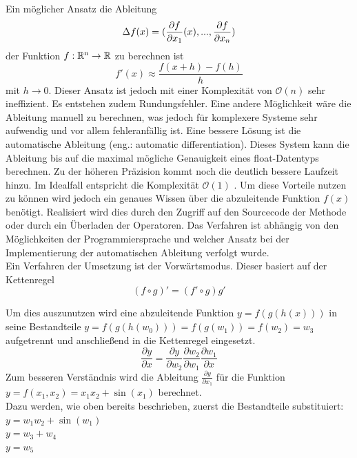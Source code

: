 \documentclass{like}
\begin{document}
Ein möglicher Ansatz die Ableitung 
\begin{equation}
	\Delta{\tiny } f(x) = (\frac{\partial f}{\partial x_1} (x), ..., \frac{\partial f}{\partial x_n})
\end{equation}
der Funktion $f:\mathbb{R} \textsuperscript{n} \rightarrow \mathbb{R} $ zu berechnen ist \\
\begin{equation}
	f'(x) \approx \frac{f(x+h) - f(h)}{h}
\end{equation}
 mit $ h \rightarrow 0$.
Dieser Ansatz ist jedoch mit einer Komplexität von $\mathcal{O}(n)$ sehr ineffizient. Es entstehen zudem Rundungsfehler.
Eine andere Möglichkeit wäre die Ableitung manuell zu berechnen, was jedoch für komplexere Systeme sehr aufwendig und vor allem fehleranfällig ist. Eine bessere Lösung ist die automatische Ableitung (eng.: automatic differentiation). 
Dieses System kann die Ableitung bis auf die maximal mögliche Genau\-ig\-keit eines float-Datentyps berechnen. Zu der höheren Präzision kommt noch die deutlich bessere Laufzeit hinzu. Im Idealfall entspricht die Komplexität $\mathcal{O}(1)$ \cite{julDiff}. Um diese Vorteile nutzen zu können wird jedoch ein genaues Wissen über die abzuleitende Funktion \(f(x)\) benötigt. Realisiert wird dies durch den Zugriff auf den Sourcecode der Methode oder durch ein Überladen der Operatoren. Das Verfahren ist abhängig von den Möglichkeiten der Programmiersprache und welcher Ansatz bei der Implementierung der automatischen Ableitung verfolgt wurde. \\

Ein Verfahren der Umsetzung ist der Vorwärtsmodus. Dieser basiert auf der Kettenregel 
\begin{equation}
	(f \circ g)' = (f' \circ g)g'
\end{equation}

Um dies auszunutzen wird eine abzuleitende Funktion $ y = f(g(h(x)))$ in seine Bestandteile $y = f(g(h(w_0))) = f(g(w_1)) = f(w_2) = w_3$ aufgetrennt und anschließend in die Ket\-ten\-re\-gel eingesetzt. 
\begin{equation}
\frac{\partial y}{\partial x} = \frac{\partial y}{\partial w_2} \frac{\partial w_2}{\partial w_1} \frac{\partial w_1}{\partial x}
\end{equation}
Zum besseren Verständnis wird die Ableitung $\frac{\partial y}{\partial x_1}$ für die Funktion
$y = f(x_1, x_2) = x_1x_2 + \sin(x_1)$  berechnet.\\
Dazu werden, wie oben bereits beschrieben, zuerst die Bestandteile substituiert:\\
$y = w_1w_2 + \sin(w_1) $ \\
$y = w_3 + w_4$ \\
$y = w_5$
\end{document}
